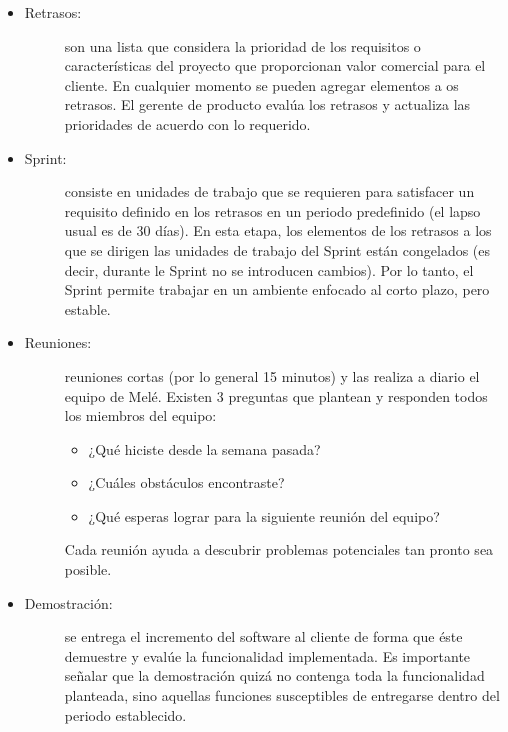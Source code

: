 \begin{itemize}
	\item 	\begin{description}
			    \item[Retrasos:] son una lista que considera la prioridad de los requisitos o características del proyecto que proporcionan valor comercial para el cliente. En cualquier momento se pueden agregar elementos a os retrasos. El gerente de producto evalúa los retrasos y actualiza las prioridades de acuerdo con lo requerido. 
			\end{description}

	\item 	\begin{description}
			    \item[Sprint:] consiste en unidades de trabajo que se requieren para satisfacer un requisito definido en los retrasos en un periodo predefinido (el lapso usual es de 30 días). En esta etapa, los elementos de los retrasos a los que se dirigen las unidades de trabajo del Sprint están congelados (es decir, durante le Sprint no se introducen cambios). Por lo tanto, el Sprint permite trabajar en un ambiente enfocado al corto plazo, pero estable.
			\end{description}

	\item 	\begin{description}
			    \item[Reuniones:] reuniones cortas (por lo general 15 minutos) y las realiza a diario el equipo de Melé. Existen 3 preguntas que plantean y responden todos los miembros del equipo:

			    \begin{itemize}
			    	\item ¿Qué hiciste desde la semana pasada?

			    	\item ¿Cuáles obstáculos encontraste? 

			    	\item ¿Qué esperas lograr para la siguiente reunión del equipo?
			    \end{itemize}

			 	Cada reunión ayuda a descubrir problemas potenciales tan pronto sea posible.
			\end{description}

	\item 	\begin{description}
			    \item[Demostración:] se entrega el incremento del software al cliente de forma que éste demuestre y evalúe la funcionalidad implementada. Es importante señalar que la demostración quizá no contenga toda la funcionalidad planteada, sino aquellas funciones susceptibles de entregarse dentro del periodo establecido.
			\end{description}
\end{itemize}



